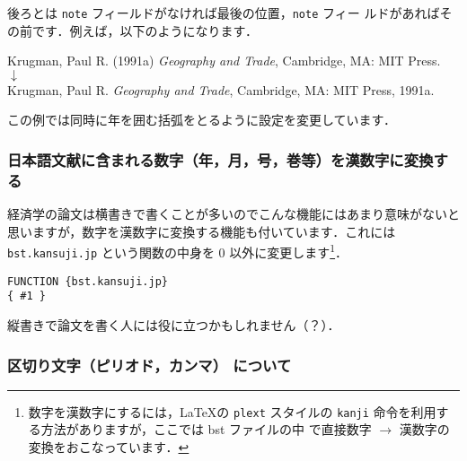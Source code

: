 \documentclass[article]{jlreq}
\begin{document}
後ろとは \texttt{note} フィールドがなければ最後の位置，\texttt{note} フィー
ルドがあればその前です．例えば，以下のようになります．
\begin{center}
 Krugman, Paul R. (1991a) \textit{Geography and Trade}, Cambridge, MA:
 MIT Press. \\
 $\downarrow$ \\
 Krugman, Paul R. \textit{Geography and Trade}, Cambridge, MA: MIT Press, 1991a.
\end{center}
この例では同時に年を囲む括弧をとるように設定を変更しています．

\subsubsection{日本語文献に含まれる数字（年，月，号，巻等）を漢数字に変換する}

経済学の論文は横書きで書くことが多いのでこんな機能にはあまり意味がないと
思いますが，数字を漢数字に変換する機能も付いています．これには 
\texttt{bst.kansuji.jp} という関数の中身を 0 以外に変更します\footnote
{数字を漢数字にするには，\LaTeX の \texttt{plext} スタイルの 
\texttt{kanji} 命令を利用する方法がありますが，ここでは bst ファイルの中
で直接数字 $\rightarrow$ 漢数字の変換をおこなっています．}．
\begin{screen}
\begin{verbatim}
FUNCTION {bst.kansuji.jp}
{ #1 }
\end{verbatim}
\end{screen}

縦書きで論文を書く人には役に立つかもしれません（？）．

\subsubsection{区切り文字（ピリオド，カンマ） について}
\end{document}
